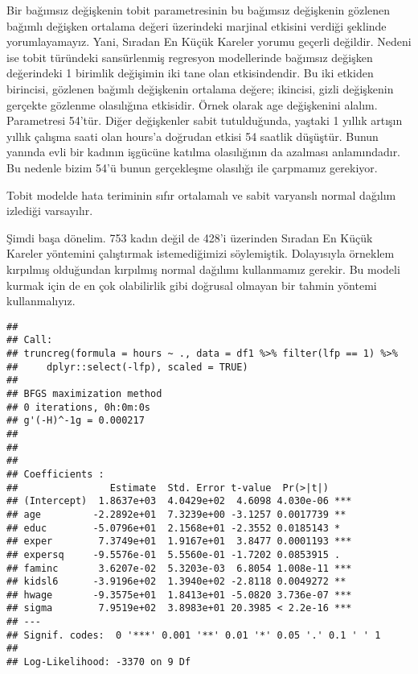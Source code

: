 \documentclass[
]{book}
\newenvironment{Shaded}{\begin{snugshade}}{\end{snugshade}}
\newcommand{\DataTypeTok}[1]{\textcolor[rgb]{0.13,0.29,0.53}{#1}}
\newcommand{\DecValTok}[1]{\textcolor[rgb]{0.00,0.00,0.81}{#1}}
\newcommand{\KeywordTok}[1]{\textcolor[rgb]{0.13,0.29,0.53}{\textbf{#1}}}
\newcommand{\NormalTok}[1]{#1}
\newcommand{\OperatorTok}[1]{\textcolor[rgb]{0.81,0.36,0.00}{\textbf{#1}}}
\newcommand{\OtherTok}[1]{\textcolor[rgb]{0.56,0.35,0.01}{#1}}
\newcommand{\StringTok}[1]{\textcolor[rgb]{0.31,0.60,0.02}{#1}}
\begin{document}
Bir bağımsız değişkenin tobit parametresinin bu bağımsız değişkenin gözlenen bağımlı değişken ortalama değeri üzerindeki marjinal etkisini verdiği şeklinde yorumlayamayız. Yani, Sıradan En Küçük Kareler yorumu geçerli değildir. Nedeni ise tobit türündeki sansürlenmiş regresyon modellerinde bağımsız değişken değerindeki 1 birimlik değişimin iki tane olan etkisindendir. Bu iki etkiden birincisi, gözlenen bağımlı değişkenin ortalama değere; ikincisi, gizli değişkenin gerçekte gözlenme olasılığına etkisidir. Örnek olarak age değişkenini alalım. Parametresi 54'tür. Diğer değişkenler sabit tutulduğunda, yaştaki 1 yıllık artışın yıllık çalışma saati olan hours'a doğrudan etkisi 54 saatlik düşüştür. Bunun yanında evli bir kadının işgücüne katılma olasılığının da azalması anlamındadır. Bu nedenle bizim 54'ü bunun gerçekleşme olasılığı ile çarpmamız gerekiyor.

Tobit modelde hata teriminin sıfır ortalamalı ve sabit varyanslı normal dağılım izlediği varsayılır.

Şimdi başa dönelim. 753 kadın değil de 428'i üzerinden Sıradan En Küçük Kareler yöntemini çalıştırmak istemediğimizi söylemiştik. Dolayısıyla örneklem kırpılmış olduğundan kırpılmış normal dağılımı kullanmamız gerekir. Bu modeli kurmak için de en çok olabilirlik gibi doğrusal olmayan bir tahmin yöntemi kullanmalıyız.

\begin{Shaded}
\end{Shaded}

\begin{verbatim}
## 
## Call:
## truncreg(formula = hours ~ ., data = df1 %>% filter(lfp == 1) %>% 
##     dplyr::select(-lfp), scaled = TRUE)
## 
## BFGS maximization method
## 0 iterations, 0h:0m:0s 
## g'(-H)^-1g = 0.000217 
##  
## 
## 
## Coefficients :
##                Estimate  Std. Error t-value  Pr(>|t|)    
## (Intercept)  1.8637e+03  4.0429e+02  4.6098 4.030e-06 ***
## age         -2.2892e+01  7.3239e+00 -3.1257 0.0017739 ** 
## educ        -5.0796e+01  2.1568e+01 -2.3552 0.0185143 *  
## exper        7.3749e+01  1.9167e+01  3.8477 0.0001193 ***
## expersq     -9.5576e-01  5.5560e-01 -1.7202 0.0853915 .  
## faminc       3.6207e-02  5.3203e-03  6.8054 1.008e-11 ***
## kidsl6      -3.9196e+02  1.3940e+02 -2.8118 0.0049272 ** 
## hwage       -9.3575e+01  1.8413e+01 -5.0820 3.736e-07 ***
## sigma        7.9519e+02  3.8983e+01 20.3985 < 2.2e-16 ***
## ---
## Signif. codes:  0 '***' 0.001 '**' 0.01 '*' 0.05 '.' 0.1 ' ' 1
## 
## Log-Likelihood: -3370 on 9 Df
\end{verbatim}
\end{document}
